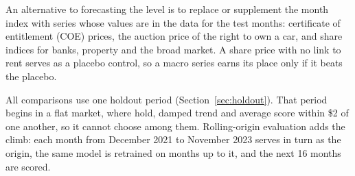 An alternative to forecasting the level is to replace or supplement the month
index with series whose values are in the data for the test months: certificate
of entitlement (COE) prices, the auction price of the right to own a car, and
share indices for banks, property and the broad market. A share price with no
link to rent serves as a placebo control, so a macro series earns its place only
if it beats the placebo.

All comparisons use one holdout period (Section~\ref{sec:holdout}). That period
begins in a flat market, where hold, damped trend and average score within \$2 of
one another, so it cannot choose among them. Rolling-origin evaluation
\cite{Tashman:2000:OutOfSample} adds the climb: each month from December 2021 to
November 2023 serves in turn as the origin, the same model is retrained on months
up to it, and the next 16 months are scored.
